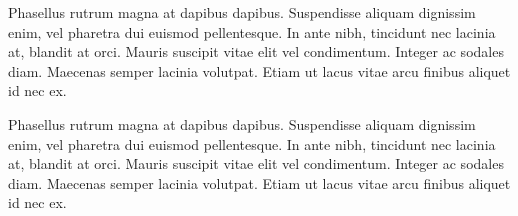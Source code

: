 Phasellus rutrum magna at dapibus dapibus. Suspendisse aliquam dignissim enim, vel pharetra dui euismod pellentesque. In ante nibh, tincidunt nec lacinia at, blandit at orci. Mauris suscipit vitae elit vel condimentum. Integer ac sodales diam. Maecenas semper lacinia volutpat. Etiam ut lacus vitae arcu finibus aliquet id nec ex.

Phasellus rutrum magna at dapibus dapibus. Suspendisse aliquam dignissim enim, vel pharetra dui euismod pellentesque. In ante nibh, tincidunt nec lacinia at, blandit at orci. Mauris suscipit vitae elit vel condimentum. Integer ac sodales diam. Maecenas semper lacinia volutpat. Etiam ut lacus vitae arcu finibus aliquet id nec ex.